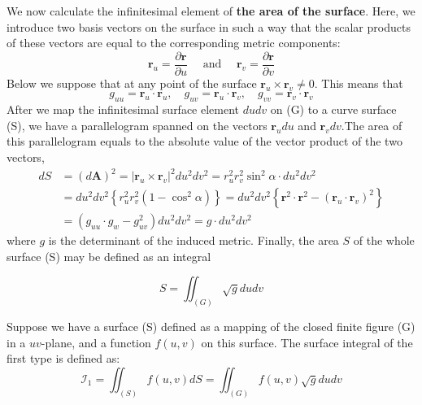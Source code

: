 We now calculate the infinitesimal element of \textbf{the area of the surface}. Here, we introduce two basis vectors on the surface in such a way that the scalar products of these vectors are equal to the corresponding metric components:
\begin{equation}
\mathbf{r}_{u}=\frac{\partial \mathbf{r}}{\partial u} \quad \text { and } \quad \mathbf{r}_{v}=\frac{\partial \mathbf{r}}{\partial v}
\end{equation}
Below we suppose that at any point of the surface $\mathbf{r}_{u} \times \mathbf{r}_{v} \neq 0 .$ This means that 
\begin{equation}
g_{u u}=\mathbf{r}_{u} \cdot \mathbf{r}_{u}, \quad g_{u v}=\mathbf{r}_{u} \cdot \mathbf{r}_{v}, \quad g_{v v}=\mathbf{r}_{v} \cdot \mathbf{r}_{v}
\end{equation}
After we map the infinitesimal surface element $dudv$ on (G) to a curve surface (S), we have a parallelogram spanned on the vectors $\mathbf{r}_{u} d u$ and $\mathbf{r}_{v} d v$.The area of this parallelogram equals to the absolute value of the vector product of the two vectors,
\begin{equation}
\begin{aligned}
d S &=(d \mathbf{A})^{2}=\left|\mathbf{r}_{u} \times \mathbf{r}_{v}\right|^{2} d u^{2} d v^{2}=r_{u}^{2} r_{v}^{2} \sin ^{2} \alpha \cdot d u^{2} d v^{2} \\
&=d u^{2} d v^{2}\left\{r_{u}^{2} r_{v}^{2}\left(1-\cos ^{2} \alpha\right)\right\}=d u^{2} d v^{2}\left\{\mathbf{r}^{2} \cdot \mathbf{r}^{2}-\left(\mathbf{r}_{u} \cdot \mathbf{r}_{v}\right)^{2}\right\} \\
&=\left(g_{u u} \cdot g_{w}-g_{u v}^{2}\right) d u^{2} d v^{2}=g \cdot d u^{2} d v^{2}
\end{aligned}
\end{equation}
where $g$ is the determinant of the induced metric. Finally, the area $S$ of the whole surface (S) may be defined as an integral 
\begin{qt}
\begin{equation}
S=\iint_{(G)} \sqrt{g} d u d v
\end{equation}
\end{qt}
\begin{defi}
        Suppose we have a surface (S) defined as a mapping of the closed finite figure (G) in a $uv$-plane, and a function $f(u,v)$ on this surface. The surface integral of the first type is defined as:
        \begin{equation}
\mathcal{I}_{1}=\iint_{(S)} f(u, v) d S=\iint_{(G)} f(u, v) \sqrt{g} d u d v
\end{equation}
\end{defi}
